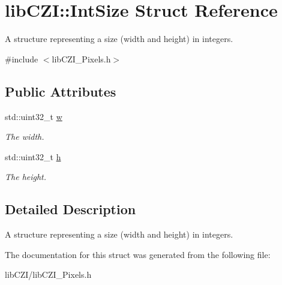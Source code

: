 \hypertarget{structlib_c_z_i_1_1_int_size}{}\section{lib\+C\+ZI\+:\+:Int\+Size Struct Reference}
\label{structlib_c_z_i_1_1_int_size}


A structure representing a size (width and height) in integers.  




{\ttfamily \#include $<$lib\+C\+Z\+I\+\_\+\+Pixels.\+h$>$}

\subsection*{Public Attributes}
\begin{DoxyCompactItemize}
\item 
\mbox{\label{structlib_c_z_i_1_1_int_size_a62979309ccf04e31423b494e68c80957}} 
std\+::uint32\+\_\+t \hyperlink{structlib_c_z_i_1_1_int_size_a62979309ccf04e31423b494e68c80957}{w}
\begin{DoxyCompactList}\small\item\em The width. \end{DoxyCompactList}\item 
\mbox{\label{structlib_c_z_i_1_1_int_size_a04b144b6c7cd7b6e994bad25a46dfdf5}} 
std\+::uint32\+\_\+t \hyperlink{structlib_c_z_i_1_1_int_size_a04b144b6c7cd7b6e994bad25a46dfdf5}{h}
\begin{DoxyCompactList}\small\item\em The height. \end{DoxyCompactList}\end{DoxyCompactItemize}


\subsection{Detailed Description}
A structure representing a size (width and height) in integers. 

The documentation for this struct was generated from the following file\+:\begin{DoxyCompactItemize}
\item 
lib\+C\+Z\+I/lib\+C\+Z\+I\+\_\+\+Pixels.\+h\end{DoxyCompactItemize}
